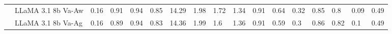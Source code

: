 \begin{table*}[t]
{\begin{tabular}{@{}ll|llll|llll|lll|ll|ll@{}}
                           & LLaMA 3.1 8b Va-Aw   & 0.16                                                                    & 0.91                                                                     & 0.94                                                                  & 0.85                                                                  & 14.29                                                                   & 1.98                                                                  & 1.72                                                                  & 1.34                                                                   & 0.91                                                                    & 0.64                                                                  & 0.32                                                                   & 0.85                                                                   & 0.8                                                                    & 0.09                                                                     & 0.49                                                                     \\
                           & LLaMA 3.1 8b Va-Ag   & 0.16                                                                    & 0.89                                                                     & 0.94                                                                  & 0.83                                                                  & 14.36                                                                   & 1.99                                                                  & 1.6                                                                   & 1.36                                                                   & 0.91                                                                    & 0.59                                                                  & 0.3                                                                    & 0.86                                                                   & 0.82                                                                   & 0.1                                                                      & 0.49                                                                     \\

\end{tabular}}
\end{table*}

